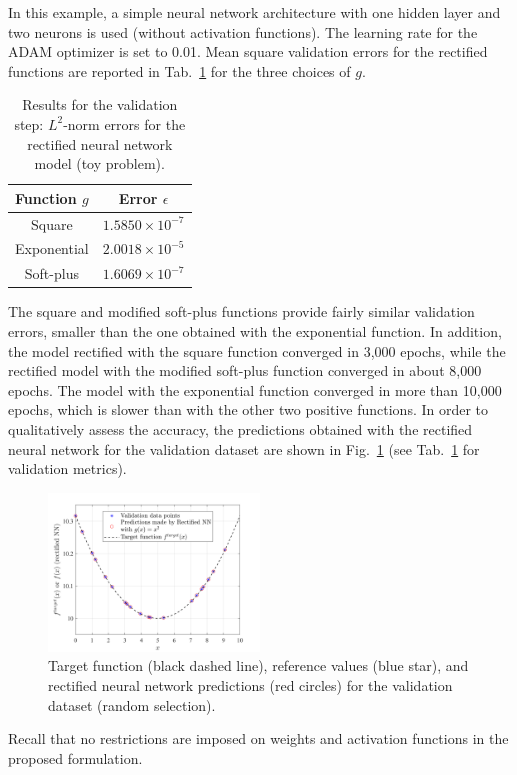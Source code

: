In this example, a simple neural network architecture with one hidden layer and two neurons is used (without activation functions). The learning rate for the ADAM optimizer is set to 0.01. Mean square validation errors for the rectified functions are reported in Tab.~\ref{tab:toy-problem-validation-errors} for the three choices of $g$. 
\begin{table}[ht!]
\centering
\begin{tabular}{|c|c|} 
 \hline
 Function $g$ & Error $\epsilon$ \\ 
 \hline
 Square & $1.5850 \times 10^{-7}$ \\ 
 \hline
 Exponential & $2.0018 \times 10^{-5}$ \\ 
 \hline
 Soft-plus & $1.6069 \times 10^{-7}$ \\ 
 \hline
 \end{tabular} 
\caption{Results for the validation step: $L^2$-norm errors for the rectified neural network model (toy problem).}
\label{tab:toy-problem-validation-errors}
\end{table}
The square and modified soft-plus functions provide fairly similar validation errors, smaller than the one obtained with the exponential function. In addition, the model rectified with the square function converged in 3,000 epochs, while the rectified model with the modified soft-plus function converged in about 8,000 epochs. The model with the exponential function converged in more than 10,000 epochs, which is slower than with the other two positive functions. In order to qualitatively assess the accuracy, the predictions obtained with the rectified neural network for the validation dataset are shown in Fig.~\ref{fig:toy-problem-qualitative-results} (see Tab.~\ref{tab:toy-problem-validation-errors} for validation metrics).
\begin{figure}[ht!]
    \begin{center}
        \includegraphics[width = 0.5\textwidth]{Pictures/toy.png}
    \end{center}
    \caption[Target function, reference values, and rectified neural network predictions.]{Target function (black dashed line), reference values (blue star), and rectified neural network predictions (red circles) for the validation dataset (random selection).}
    \label{fig:toy-problem-qualitative-results}
\end{figure}
Recall that no restrictions are imposed on weights and activation functions in the proposed formulation.

